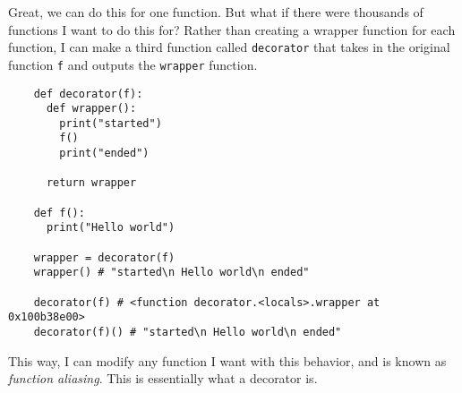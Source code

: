 \documentclass{article}
\begin{document}
  Great, we can do this for one function. But what if there were thousands of functions I want to do this for? Rather than creating a wrapper function for each function, I can make a third function called \texttt{decorator} that takes in the original function \texttt{f} and outputs the \texttt{wrapper} function. 

  \begin{lstlisting}
    def decorator(f): 
      def wrapper(): 
        print("started") 
        f()
        print("ended") 

      return wrapper

    def f(): 
      print("Hello world") 

    wrapper = decorator(f)
    wrapper() # "started\n Hello world\n ended"

    decorator(f) # <function decorator.<locals>.wrapper at 0x100b38e00>
    decorator(f)() # "started\n Hello world\n ended"
  \end{lstlisting}

  This way, I can modify any function I want with this behavior, and is known as \textit{function aliasing}. This is essentially what a decorator is. 
\end{document}
